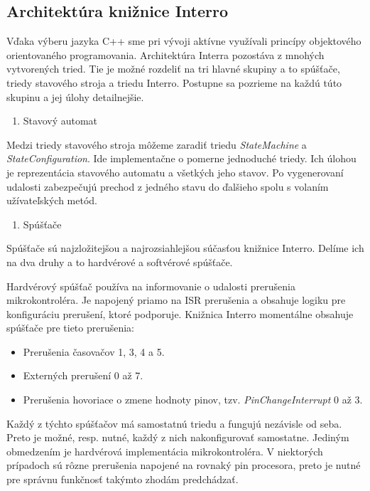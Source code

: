 \subsection{Architektúra knižnice Interro} \label{subsection:architecture-interro}
\noindent \par
Vďaka výberu jazyka C++ sme pri vývoji aktívne využívali princípy objektového orientovaného programovania. Architektúra Interra pozostáva z mnohých vytvorených tried.
Tie je možné rozdeliť na tri hlavné skupiny a to spúšťače, triedy stavového stroja a triedu Interro.
Postupne sa pozrieme na každú túto skupinu a jej úlohy detailnejšie. \par
\begin{enumerate}
    \item Stavový automat
\end{enumerate}
Medzi triedy stavového stroja môžeme zaradiť triedu \textit{StateMachine} a \textit{StateConfiguration}. Ide implementačne o pomerne jednoduché triedy. Ich úlohou
je reprezentácia stavového automatu a všetkých jeho stavov. Po vygenerovaní udalosti zabezpečujú prechod z jedného stavu do ďalšieho spolu s volaním užívateľských
metód. \par

\begin{enumerate}[resume]
    \item Spúšťače
\end{enumerate}
Spúšťače sú najzložitejšou a najrozsiahlejšou súčasťou knižnice Interro.
Delíme ich na dva druhy a to hardvérové a softvérové spúšťače. \par
Hardvérový spúšťač používa na informovanie o udalosti prerušenia mikrokontroléra. Je napojený priamo na ISR prerušenia a obsahuje logiku pre konfiguráciu prerušení,
ktoré podporuje. Knižnica Interro momentálne obsahuje spúšťače pre tieto prerušenia:
\begin{itemize}
    \item Prerušenia časovačov 1, 3, 4 a 5.
    \item Externých prerušení 0 až 7.
    \item Prerušenia hovoriace o zmene hodnoty pinov, tzv. \textit{PinChangeInterrupt} 0 až 3.
\end{itemize}

Každý z týchto spúšťačov má samostatnú triedu a fungujú nezávisle od seba. Preto je možné, resp. nutné, každý z nich
nakonfigurovať samostatne. Jediným obmedzením je hardvérová implementácia mikrokontroléra. V niektorých prípadoch sú rôzne prerušenia napojené na rovnaký pin procesora,
preto je nutné pre správnu funkčnosť takýmto zhodám predchádzať. \par

